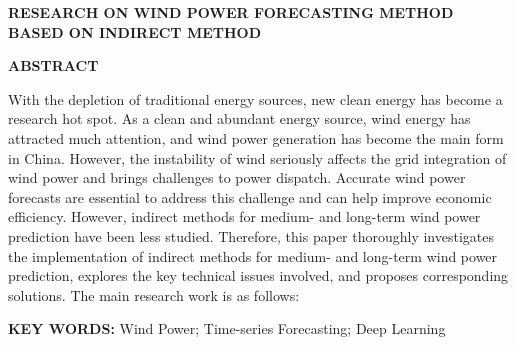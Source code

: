 \documentclass[a4paper, zihao=-4, twoside, fontset=fandol]{ctexart}
\begin{document}
{
    \newpage
    \thispagestyle{plain}  %
    
    {
        \centering
        \begin{minipage}{\dimexpr\textwidth-9em} %
            \tnr
            \centering
            \textbf{RESEARCH ON WIND POWER FORECASTING METHOD BASED ON INDIRECT METHOD}
        \end{minipage}
        \par %
        \vspace{45pt}
    }
    
    {
        \centering
        \tnr
        \textbf{ABSTRACT}
        
        \mbox{}
    
        \par %
    }
    
    
    {   
        \raggedright
        \tnr
        \quad\quad With the depletion of traditional energy sources, new clean energy has become a research hot spot. As a clean and abundant energy source, wind energy has attracted much attention, and wind power generation has become the main form in China. However, the instability of wind seriously affects the grid integration of wind power and brings challenges to power dispatch. Accurate wind power forecasts are essential to address this challenge and can help improve economic efficiency. However, indirect methods for medium- and long-term wind power prediction have been less studied. Therefore, this paper thoroughly investigates the implementation of indirect methods for medium- and long-term wind power prediction, explores the key technical issues involved, and proposes corresponding solutions. The main research work is as follows:
                
        \mbox{}
                
        \mbox{}

        \par %
    }
    
    {
        \raggedright
        \tnr
        \textbf{KEY WORDS: }
        Wind Power; Time-series Forecasting; Deep Learning

        \par %
    }
}
\end{document}
